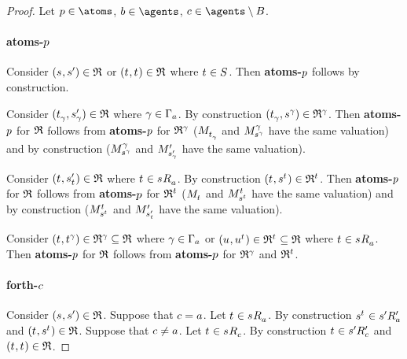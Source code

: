 \begin{proof}
Let $\atomP \in \atoms$, $\agentB \in \agents$, $\agentC \in \agents \setminus \agentsB$.

\paragraph{atoms-$\atomP$}
Consider $(\kStateS, \kStateSP) \in \refinement$ or $(\kStateT, \kStateT) \in \refinement$ where $\kStateT \in \kStates$.
Then {\bf atoms-$\atomP$} follows by construction.

Consider $(\kStateT_\gamma, \kStateSP_\gamma) \in \refinement$ where $\gamma \in \Gamma_\agentA$.
By construction $(\kStateT_\gamma, \kStateS[\gamma]) \in \refinement^\gamma$.
Then {\bf atoms-$\atomP$} for $\refinement$ follows from {\bf atoms-$\atomP$} for $\refinement^\gamma$ ($\kPModel{\kStateT_\gamma}$ and $\kPModel[\gamma]{\kStateS[\gamma]}$ have the same valuation) and by construction ($\kPModel[\gamma]{\kStateS[\gamma]}$ and $\kPModelP{\kStateSP_\gamma}$ have the same valuation).

Consider $(\kStateT, \kStateSP_{\kStateT}) \in \refinement$ where $\kStateT \in \kSuccessorsA{\kStateS}$.
By construction $(\kStateT, \kStateS[\kStateT]) \in \refinement^{\kStateT}$.
Then {\bf atoms-$\atomP$} for $\refinement$ follows from {\bf atoms-$\atomP$} for $\refinement^{\kStateT}$ ($\kPModel{\kStateT}$ and $\kPModel[\kStateT]{\kStateS[\kStateT]}$ have the same valuation) and by construction ($\kPModel[\kStateT]{\kStateS[\kStateT]}$ and $\kPModelP{\kStateSP_{\kStateT}}$ have the same valuation).

Consider $(\kStateT, \kStateT[\gamma]) \in \refinement^\gamma \subseteq \refinement$ where $\gamma \in \Gamma_\agentA$ or $(\kStateU, \kStateU[\kStateT]) \in \refinement^{\kStateT} \subseteq \refinement$ where $\kStateT \in \kSuccessorsA{\kStateS}$.
Then {\bf atoms-$\atomP$} for $\refinement$ follows from {\bf atoms-$\atomP$} for $\refinement^\gamma$ and $\refinement^{\kStateT}$.

\paragraph{forth-$\agentC$}
Consider $(\kStateS, \kStateSP) \in \refinement$.
Suppose that $\agentC = \agentA$.
Let $\kStateT \in \kSuccessorsA{\kStateS}$.
By construction $\kStateS[\kStateT] \in \kSuccessorsPA{\kStateSP}$ and $(\kStateT, \kStateS[\kStateT]) \in \refinement$.
Suppose that $\agentC \neq \agentA$.
Let $\kStateT \in \kSuccessorsC{\kStateS}$.
By construction $\kStateT \in \kSuccessorsPC{\kStateSP}$ and $(\kStateT, \kStateT) \in \refinement$.


\end{proof}
